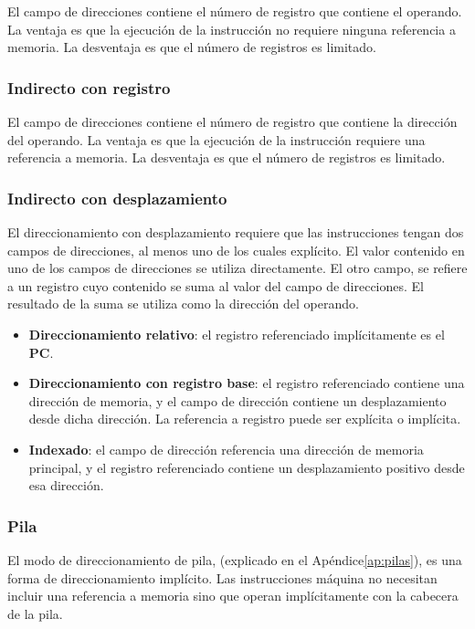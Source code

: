 \begin{subs}
  El campo de direcciones contiene el número de registro que contiene el operando. La ventaja es que la ejecución de la instrucción no requiere ninguna referencia a memoria. La desventaja es que el número de registros es limitado.

  \subsubsection{Indirecto con registro}

  El campo de direcciones contiene el número de registro que contiene la dirección del operando. La ventaja es que la ejecución de la instrucción requiere una referencia a memoria. La desventaja es que el número de registros es limitado.

  \subsubsection{Indirecto con desplazamiento}

  El direccionamiento con desplazamiento requiere que las instrucciones tengan dos campos de direcciones, al menos uno de los cuales explícito. El valor contenido en uno de los campos de direcciones se utiliza directamente. El otro campo, se refiere a un registro cuyo contenido se suma al valor del campo de direcciones. El resultado de la suma se utiliza como la dirección del operando.

  \begin{itemize}
    \item \textbf{Direccionamiento relativo}: el registro referenciado implícitamente es el \textbf{PC}. 
    \item \textbf{Direccionamiento con registro base}: el registro referenciado contiene una dirección de memoria, y el campo de dirección contiene un desplazamiento desde dicha dirección. La referencia a registro puede ser explícita o implícita.
    \item \textbf{Indexado}: el campo de dirección referencia una dirección de memoria principal, y el registro referenciado contiene un desplazamiento positivo desde esa dirección.
  \end{itemize}

  \subsubsection{Pila}

  El modo de direccionamiento de pila, (explicado en el Apéndice\ref{ap:pilas}), es una forma de direccionamiento implícito. Las instrucciones máquina no necesitan incluir una referencia a memoria sino que operan implícitamente con la cabecera de la pila.
\end{subs}


